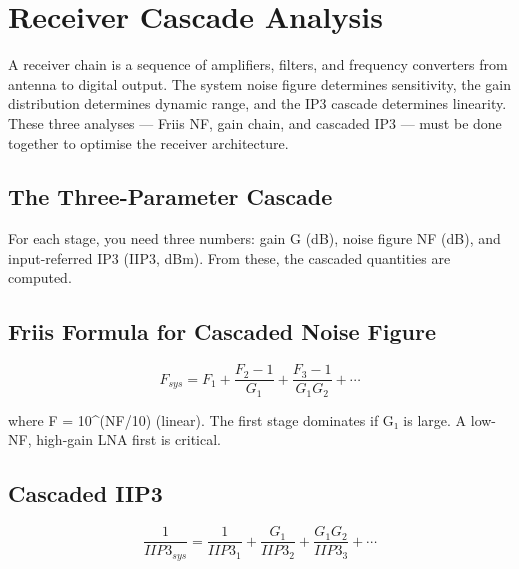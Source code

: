\section{Receiver Cascade Analysis}\label{sec:wiki_cascade_analysis}



A receiver chain is a sequence of amplifiers, filters, and frequency converters from antenna to digital output. The system noise figure determines sensitivity, the gain distribution determines dynamic range, and the IP3 cascade determines linearity. These three analyses — Friis NF, gain chain, and cascaded IP3 — must be done together to optimise the receiver architecture.

      

\subsection{The Three-Parameter Cascade}

      

For each stage, you need three numbers: gain G (dB), noise figure NF (dB), and input-referred IP3 (IIP3, dBm). From these, the cascaded quantities are computed.


      

\subsection{Friis Formula for Cascaded Noise Figure}

      
\[F_{sys} = F_1 + \dfrac{F_2-1}{G_1} + \dfrac{F_3-1}{G_1 G_2} + \cdots\]

      

where F = 10\textasciicircum{}(NF/10) (linear). The first stage dominates if G₁ is large. A low-NF, high-gain LNA first is critical.

      

\subsection{Cascaded IIP3}

      
\[\dfrac{1}{IIP3_{sys}} = \dfrac{1}{IIP3_1} + \dfrac{G_1}{IIP3_2} + \dfrac{G_1 G_2}{IIP3_3} + \cdots\]

      

